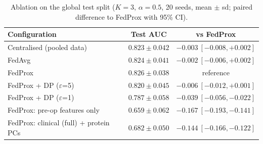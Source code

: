 \begin{table}[t]
\caption{Ablation on the global test split ($K=3$, $\alpha=0.5$, 20 seeds, mean $\pm$ sd; paired difference to FedProx with 95\% CI).}
\centering\scriptsize
\setlength{\tabcolsep}{4pt}
\begin{tabular}{p{2.9cm}cc}
\toprule
Configuration & Test AUC & vs FedProx \\
\midrule
Centralised (pooled data) & $0.823 \pm 0.042$ & $-0.003\ [\ensuremath{-}0.008, +0.002]$ \\
FedAvg & $0.824 \pm 0.041$ & $-0.002\ [\ensuremath{-}0.006, +0.002]$ \\
FedProx & $0.826 \pm 0.038$ & reference \\
FedProx + DP ($\varepsilon$=5) & $0.820 \pm 0.045$ & $-0.006\ [\ensuremath{-}0.012, +0.001]$ \\
FedProx + DP ($\varepsilon$=1) & $0.787 \pm 0.058$ & $-0.039\ [\ensuremath{-}0.056, \ensuremath{-}0.022]$ \\
FedProx: pre-op features only & $0.659 \pm 0.062$ & $-0.167\ [\ensuremath{-}0.193, \ensuremath{-}0.141]$ \\
FedProx: clinical (full) + protein PCs & $0.682 \pm 0.050$ & $-0.144\ [\ensuremath{-}0.166, \ensuremath{-}0.122]$ \\
\bottomrule
\end{tabular}
\label{tab:global_ablation}
\end{table}
